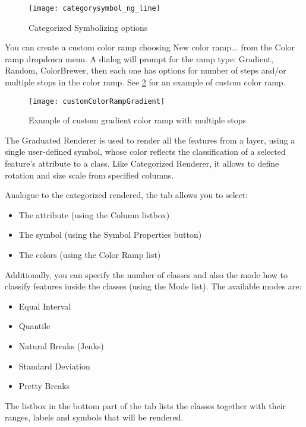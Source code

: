 \begin{figure}[ht]
   \centering
   \caption{Categorized Symbolizing options \nixcaption}\label{fig:catsymNG}
   \texttt{[image: categorysymbol\_ng\_line]}
\end{figure}

You can create a custom color ramp choosing New color ramp... from the Color 
ramp dropdown menu. A dialog will prompt for the ramp type: Gradient, Random,
ColorBrewer, then each one has options for number of steps and/or multiple
stops in the color ramp. See \ref{fig:ccrg} for an example of custom color
ramp.

\begin{figure}[ht]
   \centering
   \caption{Example of custom gradient color ramp with multiple stops \nixcaption}\label{fig:ccrg}
   \texttt{[image: customColorRampGradient]}
\end{figure}


The Graduated Renderer is used to render all the features from a layer, using
a single user-defined symbol, whose color reflects the classification of a selected
feature's attribute to a class. Like Categorized Renderer, it allows to define
rotation and size scale from specified columns.

Analogue to the categorized rendered, the  tab allows you to select:

\begin{itemize}[label=--]
\item The attribute (using the Column listbox)
\item The symbol (using the Symbol Properties button)
\item The colors (using the Color Ramp list)
\end{itemize}

Additionally, you can specify the number of classes and also the mode how to
classify features inside the classes (using the Mode list). The available modes are:
\begin{itemize}
 \item Equal Interval
 \item Quantile
 \item Natural Breaks (Jenks)
 \item Standard Deviation
 \item Pretty Breaks
\end{itemize}

The listbox in the  bottom part of the  tab lists the classes together with their ranges,
labels and symbols that will be rendered.


